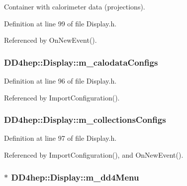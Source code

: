 Container with calorimeter data (projections). 

Definition at line 99 of file Display.h.

Referenced by OnNewEvent().\hypertarget{class_d_d4hep_1_1_display_a6b3fd66eb5ee434f3cf10b2934cb71a3}{
\subsubsection[{m\_\-calodataConfigs}]{ {\bf DD4hep::Display::m\_\-calodataConfigs}}}
\label{class_d_d4hep_1_1_display_a6b3fd66eb5ee434f3cf10b2934cb71a3}


Definition at line 96 of file Display.h.

Referenced by ImportConfiguration().\hypertarget{class_d_d4hep_1_1_display_af1a17085548605e16470dc43e017d209}{
\subsubsection[{m\_\-collectionsConfigs}]{ {\bf DD4hep::Display::m\_\-collectionsConfigs}}}
\label{class_d_d4hep_1_1_display_af1a17085548605e16470dc43e017d209}


Definition at line 97 of file Display.h.

Referenced by ImportConfiguration(), and OnNewEvent().\hypertarget{class_d_d4hep_1_1_display_ac5b8a0eed40113e808530571cfe5b9ca}{
\subsubsection[{m\_\-dd4Menu}]{$\ast$ {\bf DD4hep::Display::m\_\-dd4Menu}}}
\label{class_d_d4hep_1_1_display_ac5b8a0eed40113e808530571cfe5b9ca}


